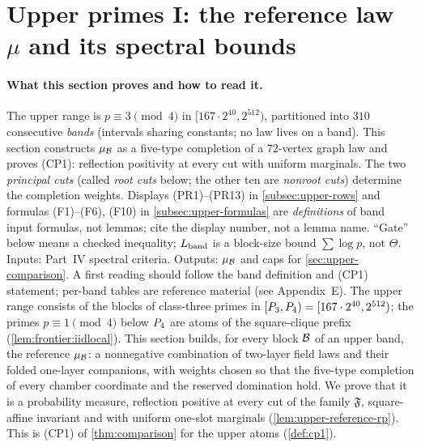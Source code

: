 
\section{Upper primes I: the reference law \texorpdfstring{$\mu$}{mu} and its spectral bounds}
\label{sec:upper-reference}

\paragraph{What this section proves and how to read it.}
The upper range is $p\equiv3\pmod4$ in
$[167\cdot2^{40},2^{512})$, partitioned into $310$ consecutive
\emph{bands} (intervals sharing constants; no law lives on a band).
This section constructs $\mu_\mathcal B$ as a five-type completion of a
$72$-vertex graph law and proves (CP1): reflection positivity at
every cut with uniform marginals. The two \emph{principal cuts}
(called \emph{root cuts} below; the other ten are \emph{nonroot cuts})
determine the completion weights. Displays (PR1)--(PR13)
in \cref{subsec:upper-rows} and formulas (F1)--(F6), (F10) in
\cref{subsec:upper-formulas} are \emph{definitions} of band
input formulas, not lemmas; cite the display number, not a lemma
name.
``Gate'' below means a checked inequality; $L_{\rm band}$ is a
block-size bound $\sum\log p$, not $\Theta$. Inputs: Part~IV
spectral criteria. Outputs: $\mu_\mathcal B$ and caps for
\cref{sec:upper-comparison}. A first reading should follow the band
definition and (CP1) statement; per-band tables are reference
material (see Appendix~E).
The upper range consists of the blocks of class-three primes in
$[P_3,P_4)=[167\cdot2^{40},2^{512})$; the primes $p\equiv1\pmod4$ below
$P_4$ are atoms of the square-clique prefix (\cref{lem:frontier:iidlocal}).
This section builds, for every block $\mathcal B$ of an upper band, the reference
$\mu_\mathcal B$: a nonnegative combination of two-layer field laws and their folded
one-layer companions, with weights chosen so that the five-type completion of
every chamber coordinate and the reserved domination hold. We prove that it is a
probability measure, reflection positive at every cut of the family $\mathfrak F$,
square-affine invariant and with uniform one-slot marginals
(\cref{lem:upper-reference-rp}). This is (CP1) of \cref{thm:comparison} for the
upper atoms (\cref{def:cp1}).

